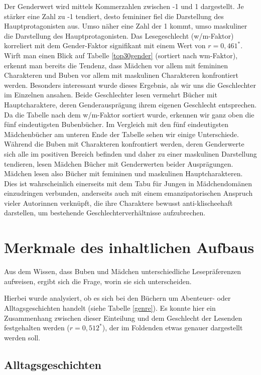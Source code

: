 Der Genderwert wird mittels Kommerzahlen zwischen -1 und 1 dargestellt.
Je stärker eine Zahl zu -1 tendiert, desto femininer fiel die
Darstellung des Hauptprotagonisten aus. Umso näher eine Zahl der 1
kommt, umso maskuliner die Darstellung des Hauptprotagonisten. Das
Lesegeschlecht (w/m-Faktor) korreliert mit dem Gender-Faktor signifikant
mit einem Wert von $r= 0{,}461^*$. Wirft man einen Blick auf Tabelle
\ref{top30gender} (sortiert nach wm-Faktor), erkennt man bereits die
Tendenz, dass Mädchen vor allem mit femininen Charakteren und Buben vor
allem mit maskulinen Charakteren konfrontiert werden. Besonders
interessant wurde dieses Ergebnis, als wir uns die Geschlechter im
Einzelnen ansahen. Beide Geschlechter lesen vermehrt Bücher mit
Hauptcharaktere, deren Genderausprägung ihrem eigenen Geschlecht
entsprechen. Da die Tabelle nach dem w/m-Faktor sortiert wurde, erkennen
wir ganz oben die fünf eindeutigsten Bubenbücher. Im Vergleich mit den
fünf eindeutigsten Mädchenbücher am unteren Ende der Tabelle sehen wir
einige Unterschiede. Während die Buben mit Charakteren konfrontiert
werden, deren Genderwerte sich alle im positiven Bereich befinden und
daher zu einer maskulinen Darstellung tendieren, lesen Mädchen Bücher
mit Genderwerten beider Ausprägungen. Mädchen lesen also Bücher mit
femininen und maskulinen Hauptcharakteren. Dies ist wahrscheinlich
einerseits mit dem Tabu für Jungen in Mädchendomänen einzudringen
verbunden, anderseits auch mit einem emanzipatorischen Anspruch vieler
Autorinnen verknüpft, die ihre Charaktere bewusst anti-klischeehaft
darstellen, um bestehende Geschlechterverhältnisse aufzubrechen.



\section{Merkmale des inhaltlichen Aufbaus}

Aus dem Wissen, dass Buben und Mädchen unterschiedliche Lesepräferenzen
aufweisen, ergibt sich die Frage, worin sie sich unterscheiden.

Hierbei wurde analysiert, ob es sich bei den Büchern um Abenteuer- oder
Alltagsgeschichten handelt (siehe Tabelle \ref{genre}). Es konnte hier
ein Zusammenhang zwischen dieser Einteilung und dem Geschlecht der
Lesenden festgehalten werden ($r= 0{,}512^*$), der im Foldenden etwas
genauer dargestellt werden soll.



\subsection{Alltagsgeschichten}


